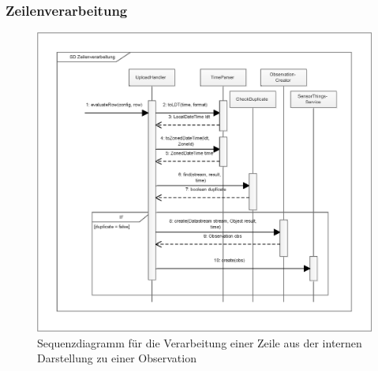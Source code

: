\subsubsection{Zeilenverarbeitung}
\begin{figure}[htbp]
\centering
\includegraphics[scale=0.4]{uml/SD_row.eps}
\caption{Sequenzdiagramm für die Verarbeitung einer Zeile aus der internen Darstellung zu einer Observation}
\end{figure}

\clearpage
